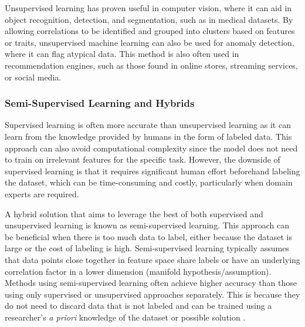         Unsupervised learning has proven useful in computer vision, where it can aid in object recognition, detection, and segmentation, such as in medical datasets. By allowing correlations to be identified and grouped into clusters based on features or traits, unsupervised machine learning can also be used for anomaly detection, where it can flag atypical data. This method is also often used in recommendation engines, such as those found in online stores, streaming services, or social media.


        \subsubsection{Semi-Supervised Learning and Hybrids}


        Supervised learning is often more accurate than unsupervised learning as it can learn from the knowledge provided by humans in the form of labeled data. This approach can also avoid computational complexity since the model does not need to train on irrelevant features for the specific task. However, the downside of supervised learning is that it requires significant human effort beforehand labeling the dataset, which can be time-consuming and costly, particularly when domain experts are required.

        A hybrid solution that aims to leverage the best of both supervised and unsupervised learning is known as semi-supervised learning. This approach can be beneficial when there is too much data to label, either because the dataset is large or the cost of labeling is high. Semi-supervised learning typically assumes that data points close together in feature space share labels or have an underlying correlation factor in a lower dimension (manifold hypothesis/assumption). Methods using semi-supervised learning often achieve higher accuracy than those using only supervised or unsupervised approaches separately. This is because they do not need to discard data that is not labeled and can be trained using a researcher's \textit{a priori} knowledge of the dataset or possible solution \cite{reddySemisupervisedLearningBrief2018, berthelotMixMatchHolisticApproach2019}.
        

